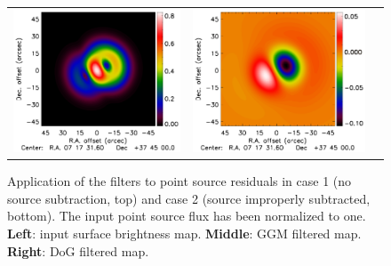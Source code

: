 \documentclass[traditabstract]{aa}
\begin{document}
\begin{figure}[h]
{\begin{tabular}{lll}
\includegraphics[trim=2.3cm 0.7cm 0cm 0cm, clip=true, scale=1]{Figure/PSalone_GGM_PointSourceResidual_15_15_45.pdf} & 
\includegraphics[trim=2.3cm 0.7cm 0cm 0cm, clip=true, scale=1]{Figure/PSalone_DoG_PointSourceResidual_15_15_45.pdf} 
\end{tabular}}
\caption{\footnotesize{Application of the filters to point source residuals in case 1 (no source subtraction, top) and case 2 (source improperly subtracted, bottom). The input point source flux has been normalized to one. {\bf Left}: input surface brightness map. {\bf Middle}: GGM filtered map. {\bf Right}: DoG filtered map.}}
\label{fig:Point_source_maps}
\end{figure}
\end{document}
